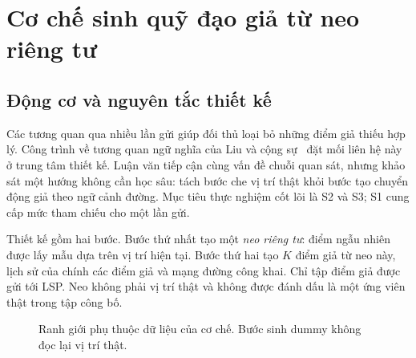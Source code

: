 \chapter{Cơ chế sinh quỹ đạo giả từ neo riêng tư}
\label{ch:method}

\section{Động cơ và nguyên tắc thiết kế}

Các tương quan qua nhiều lần gửi giúp đối thủ loại bỏ những điểm giả thiếu hợp lý. Công trình về tương quan ngữ nghĩa của Liu và cộng sự~\cite{liu2026semantic} đặt mối liên hệ này ở trung tâm thiết kế. Luận văn tiếp cận cùng vấn đề chuỗi quan sát, nhưng khảo sát một hướng không cần học sâu: tách bước che vị trí thật khỏi bước tạo chuyển động giả theo ngữ cảnh đường. Mục tiêu thực nghiệm cốt lõi là S2 và S3; S1 cung cấp mức tham chiếu cho một lần gửi.

Thiết kế gồm hai bước. Bước thứ nhất tạo một \emph{neo riêng tư}: điểm ngẫu nhiên được lấy mẫu dựa trên vị trí hiện tại. Bước thứ hai tạo $K$ điểm giả từ neo này, lịch sử của chính các điểm giả và mạng đường công khai. Chỉ tập điểm giả được gửi tới LSP. Neo không phải vị trí thật và không được đánh dấu là một ứng viên thật trong tập công bố.

\begin{figure}[htbp]
\centering
{}
\caption{Ranh giới phụ thuộc dữ liệu của cơ chế. Bước sinh dummy không đọc lại vị trí thật.}
\end{figure}

